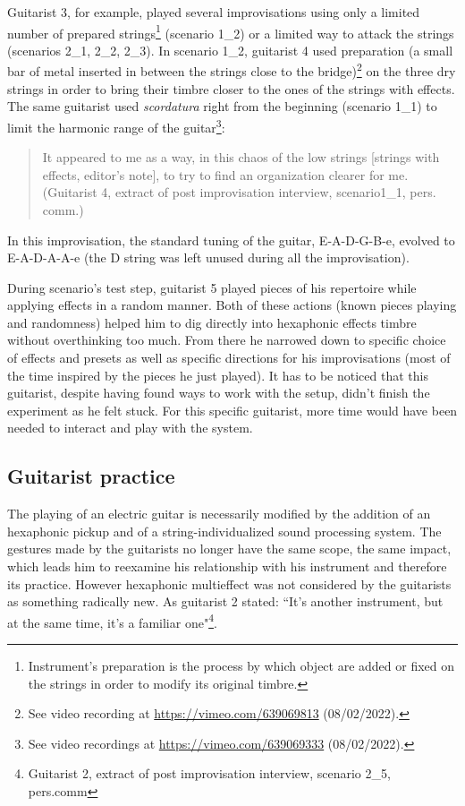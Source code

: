 \documentclass{article}
\begin{document}
Guitarist 3, for example, played several improvisations using only a limited number of prepared strings\footnote{Instrument's preparation is the process by which object are added or fixed on the strings in order to modify its original timbre.} (scenario 1\_2) or a limited way to attack the strings (scenarios 2\_1, 2\_2, 2\_3). In scenario 1\_2, guitarist 4 used preparation (a small bar of metal inserted in between the strings close to the bridge)\footnote{See video recording at \url{https://vimeo.com/639069813} (08/02/2022).} on the three dry strings in order to bring their timbre closer to the ones of the strings with effects. The same guitarist used \textit{scordatura} right from the beginning (scenario 1\_1) to limit the harmonic range of the guitar\footnote{See video recordings at \url{https://vimeo.com/639069333} (08/02/2022).}:
    \begin{quote}
     It appeared to me as a way, in this chaos of the low strings [strings with effects, editor's note], to try to find an organization clearer for me. (Guitarist 4, extract of post improvisation interview, scenario1\_1, pers. comm.)
    \end{quote}
In this improvisation, the standard tuning of the guitar, E-A-D-G-B-e, evolved to E-A-D-A-A-e (the D string was left unused during all the improvisation). 

During scenario's test step, guitarist 5 played pieces of his repertoire while applying effects in a random manner. Both of these actions (known pieces playing and randomness) helped him to dig directly into hexaphonic effects timbre without overthinking too much. From there he narrowed down to specific choice of effects and presets as well as specific directions for his improvisations (most of the time inspired by the pieces he just played).  It has to be noticed that this guitarist, despite having found ways to work with the setup, didn't finish the experiment as he felt stuck. For this specific guitarist, more time would have been needed to interact and play with the system.  

\subsection{Guitarist practice}
The playing of an electric guitar is necessarily modified by the addition of an hexaphonic pickup and of a string-individualized sound processing system. The gestures made by the guitarists no longer have the same scope, the same impact, which leads him to reexamine his relationship with his instrument and therefore its practice.
However hexaphonic multieffect was not considered by the guitarists as something radically new.  As guitarist 2 stated: ``It's another instrument, but at the same time, it's a familiar one"\footnote{Guitarist 2, extract of post improvisation interview,  scenario 2\_5, pers.comm}. 
\end{document}
